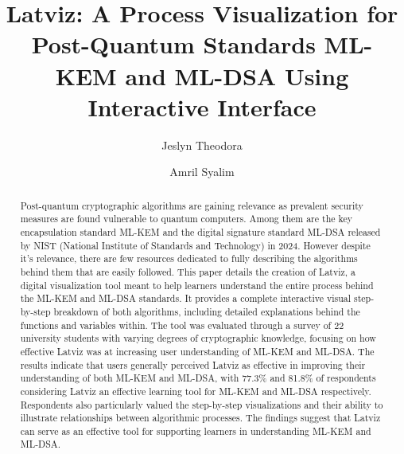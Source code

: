 \documentclass[runningheads]{llncs}
\begin{document}
%
\title{Latviz: A Process Visualization for Post-Quantum Standards ML-KEM and ML-DSA Using Interactive Interface}
%
%
\author{Jeslyn Theodora \and Amril Syalim}
%
%
%
\maketitle              %
%
\begin{abstract}
Post-quantum cryptographic algorithms are gaining relevance as prevalent security measures are found vulnerable to quantum computers. Among them are the key encapsulation standard ML-KEM and the digital signature standard ML-DSA released by NIST (National Institute of Standards and Technology) in 2024. However despite it's relevance, there are few resources dedicated to fully describing the algorithms behind them that are easily followed. This paper details the creation of Latviz, a digital visualization tool meant to help learners understand the entire process behind the ML-KEM and ML-DSA standards. It provides a complete interactive visual step-by-step breakdown of both algorithms, including detailed explanations behind the functions and variables within. The tool was evaluated through a survey of 22 university students with varying degrees of cryptographic knowledge, focusing on how effective Latviz was at increasing user understanding of ML-KEM and ML-DSA. The results indicate that users generally perceived Latviz as effective in improving their understanding of both ML-KEM and ML-DSA, with 77.3\% and 81.8\% of respondents considering Latviz an effective learning tool for ML-KEM and ML-DSA respectively. Respondents also particularly valued the step-by-step visualizations and their ability to illustrate relationships between algorithmic processes. The findings suggest that Latviz can serve as an effective tool for supporting learners in understanding ML-KEM and ML-DSA.

\end{abstract}
%
%
%
\end{document}
